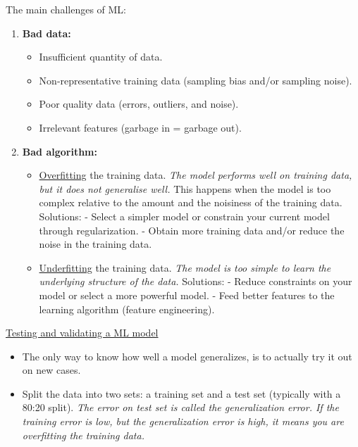 \newpage
The main challenges of ML:
\begin{enumerate}
\vspace{-4.0mm}
\item
\textbf{Bad data:}
\begin{itemize}
\vspace{-2.0mm}
\item
Insufficient quantity of data.
\item
Non-representative training data (sampling bias and/or sampling noise).
\item
Poor quality data (errors, outliers, and noise).
\item
Irrelevant features (garbage in = garbage out).
\end{itemize}
\item
\textbf{Bad algorithm:}
\begin{itemize}
\vspace{-2.0mm}
\item
\underline{Overfitting} the training data.\newline
\textit{The model performs well on training data, but it does not generalise well.}\newline
This happens when the model is too complex relative to the amount and the noisiness of the training data.
Solutions:\newline
- Select a simpler model or constrain your current model through regularization.\newline
- Obtain more training data and/or reduce the noise in the training data.
\item
\underline{Underfitting} the training data.\newline
\textit{The model is too simple to learn the underlying structure of the data.}
Solutions:\newline
- Reduce constraints on your model or select a more powerful model.\newline
- Feed better features to the learning algorithm (feature engineering).
\end{itemize}
\end{enumerate}

\underline{Testing and validating a ML model}
\begin{itemize}
\vspace{-3.0mm}
\item
The only way to know how well a model generalizes, is to actually try it out on new cases.
\item
Split the data into two sets: a training set and a test set (typically with a 80:20 split).\newline
\textit{The error on test set is called the generalization error.
If the training error is low, but the generalization error is high, it means you are overfitting the training data.}
\end{itemize}

